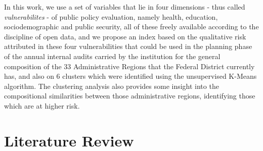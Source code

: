 \documentclass[conference]{IEEEtran}
\begin{document}
In this work, we use a set of variables that lie in four dimensions - thus called \textit{vulnerabilites} - of public policy evaluation, namely health, education, sociodemographic and public security, all of these freely available according to the discipline of open data, and we propose an index based on the qualitative risk attributed in these four vulnerabilities that could be used in the planning phase of the annual internal audits carried by the institution for the general composition of the 33 Administrative Regions that the Federal District currently has, and also on 6 clusters which were identified using the unsupervised K-Means algorithm. The clustering analysis also provides some insight into the compositional similarities between those administrative regions, identifying those which are at higher risk.





\section{Literature Review}
\end{document}
